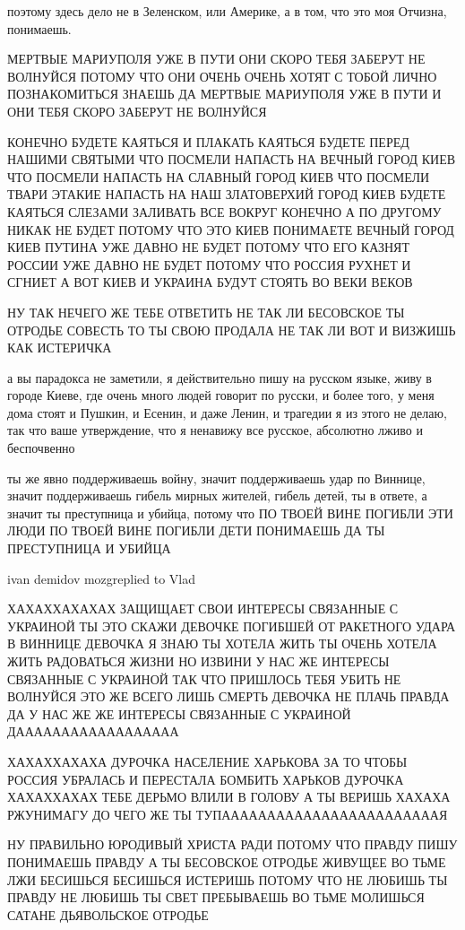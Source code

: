 поэтому здесь дело не в Зеленском, или Америке, а в том, что это моя Отчизна,
понимаешь.

МЕРТВЫЕ МАРИУПОЛЯ УЖЕ В ПУТИ ОНИ СКОРО ТЕБЯ ЗАБЕРУТ НЕ ВОЛНУЙСЯ ПОТОМУ ЧТО ОНИ
ОЧЕНЬ ОЧЕНЬ ХОТЯТ С ТОБОЙ ЛИЧНО ПОЗНАКОМИТЬСЯ ЗНАЕШЬ ДА МЕРТВЫЕ МАРИУПОЛЯ УЖЕ В
ПУТИ И ОНИ ТЕБЯ СКОРО ЗАБЕРУТ НЕ ВОЛНУЙСЯ

КОНЕЧНО БУДЕТЕ КАЯТЬСЯ И ПЛАКАТЬ КАЯТЬСЯ БУДЕТЕ ПЕРЕД НАШИМИ СВЯТЫМИ ЧТО
ПОСМЕЛИ НАПАСТЬ НА ВЕЧНЫЙ ГОРОД КИЕВ ЧТО ПОСМЕЛИ НАПАСТЬ НА СЛАВНЫЙ ГОРОД КИЕВ
ЧТО ПОСМЕЛИ ТВАРИ ЭТАКИЕ НАПАСТЬ НА НАШ ЗЛАТОВЕРХИЙ ГОРОД КИЕВ БУДЕТЕ КАЯТЬСЯ
СЛЕЗАМИ ЗАЛИВАТЬ ВСЕ ВОКРУГ КОНЕЧНО А ПО ДРУГОМУ НИКАК НЕ БУДЕТ ПОТОМУ ЧТО ЭТО
КИЕВ ПОНИМАЕТЕ ВЕЧНЫЙ ГОРОД КИЕВ ПУТИНА УЖЕ ДАВНО НЕ БУДЕТ ПОТОМУ ЧТО ЕГО
КАЗНЯТ РОССИИ УЖЕ ДАВНО НЕ БУДЕТ ПОТОМУ ЧТО РОССИЯ РУХНЕТ И СГНИЕТ А ВОТ КИЕВ И
УКРАИНА БУДУТ СТОЯТЬ ВО ВЕКИ ВЕКОВ

НУ ТАК НЕЧЕГО ЖЕ ТЕБЕ ОТВЕТИТЬ НЕ ТАК ЛИ БЕСОВСКОЕ ТЫ ОТРОДЬЕ СОВЕСТЬ ТО ТЫ
СВОЮ ПРОДАЛА НЕ ТАК ЛИ ВОТ И ВИЗЖИШЬ КАК ИСТЕРИЧКА


а вы парадокса не заметили, я действительно пишу на русском языке, живу в
городе Киеве, где очень много людей говорит по русски, и более того, у меня
дома стоят и Пушкин, и Есенин, и даже Ленин, и трагедии я из этого не делаю,
так что ваше утверждение, что я ненавижу все русское, абсолютно лживо и
беспочвенно

ты же явно поддерживаешь войну, значит поддерживаешь удар по Виннице, значит
поддерживаешь гибель мирных жителей, гибель детей, ты в ответе, а значит ты
преступница и убийца, потому что ПО ТВОЕЙ ВИНЕ ПОГИБЛИ ЭТИ ЛЮДИ ПО ТВОЕЙ ВИНЕ
ПОГИБЛИ ДЕТИ ПОНИМАЕШЬ ДА ТЫ ПРЕСТУПНИЦА И УБИЙЦА

ivan demidov mozgreplied to Vlad

ХАХАХХАХАХАХ ЗАЩИЩАЕТ СВОИ ИНТЕРЕСЫ СВЯЗАННЫЕ С УКРАИНОЙ ТЫ ЭТО СКАЖИ ДЕВОЧКЕ
ПОГИБШЕЙ ОТ РАКЕТНОГО УДАРА В ВИННИЦЕ ДЕВОЧКА Я ЗНАЮ ТЫ ХОТЕЛА ЖИТЬ ТЫ ОЧЕНЬ
ХОТЕЛА ЖИТЬ РАДОВАТЬСЯ ЖИЗНИ НО ИЗВИНИ У НАС ЖЕ ИНТЕРЕСЫ СВЯЗАННЫЕ С УКРАИНОЙ
ТАК ЧТО ПРИШЛОСЬ ТЕБЯ УБИТЬ НЕ ВОЛНУЙСЯ ЭТО ЖЕ ВСЕГО ЛИШЬ СМЕРТЬ ДЕВОЧКА НЕ
ПЛАЧЬ ПРАВДА ДА У НАС ЖЕ ЖЕ ИНТЕРЕСЫ СВЯЗАННЫЕ С УКРАИНОЙ ДАААААААААААААААААА

ХАХАХХАХАХА ДУРОЧКА НАСЕЛЕНИЕ ХАРЬКОВА ЗА ТО ЧТОБЫ РОССИЯ УБРАЛАСЬ И ПЕРЕСТАЛА
БОМБИТЬ ХАРЬКОВ ДУРОЧКА ХАХАХХАХАХ ТЕБЕ ДЕРЬМО ВЛИЛИ В ГОЛОВУ А ТЫ ВЕРИШЬ
ХАХАХА РЖУНИМАГУ ДО ЧЕГО ЖЕ ТЫ ТУПААААААААААААААААААААААААЯ

НУ ПРАВИЛЬНО ЮРОДИВЫЙ ХРИСТА РАДИ ПОТОМУ ЧТО ПРАВДУ ПИШУ ПОНИМАЕШЬ ПРАВДУ А ТЫ
БЕСОВСКОЕ ОТРОДЬЕ ЖИВУЩЕЕ ВО ТЬМЕ ЛЖИ БЕСИШЬСЯ БЕСИШЬСЯ ИСТЕРИШЬ ПОТОМУ ЧТО НЕ
ЛЮБИШЬ ТЫ ПРАВДУ НЕ ЛЮБИШЬ ТЫ СВЕТ ПРЕБЫВАЕШЬ ВО ТЬМЕ МОЛИШЬСЯ САТАНЕ
ДЬЯВОЛЬСКОЕ ОТРОДЬЕ

